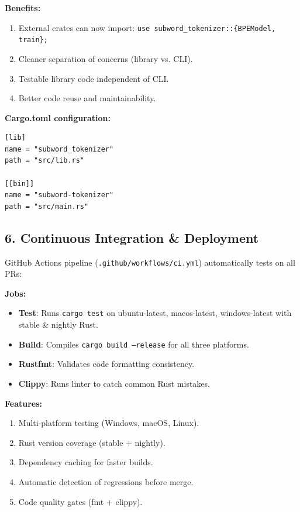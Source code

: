 \documentclass[11pt]{article}
\begin{document}
\textbf{Benefits:}
\begin{enumerate}[leftmargin=1.5em]
  \item External crates can now import: \texttt{use subword\_tokenizer::\{BPEModel, train\};}
  \item Cleaner separation of concerns (library vs. CLI).
  \item Testable library code independent of CLI.
  \item Better code reuse and maintainability.
\end{enumerate}

\textbf{Cargo.toml configuration:}
\begin{verbatim}
[lib]
name = "subword_tokenizer"
path = "src/lib.rs"

[[bin]]
name = "subword-tokenizer"
path = "src/main.rs"
\end{verbatim}

\subsection{6. Continuous Integration \& Deployment}
GitHub Actions pipeline (\texttt{.github/workflows/ci.yml}) automatically tests on all PRs:

\textbf{Jobs:}
\begin{itemize}[leftmargin=1.2em]
  \item \textbf{Test}: Runs \texttt{cargo test} on ubuntu-latest, macos-latest, windows-latest with stable \& nightly Rust.
  \item \textbf{Build}: Compiles \texttt{cargo build --release} for all three platforms.
  \item \textbf{Rustfmt}: Validates code formatting consistency.
  \item \textbf{Clippy}: Runs linter to catch common Rust mistakes.
\end{itemize}

\textbf{Features:}
\begin{enumerate}[leftmargin=1.5em]
  \item Multi-platform testing (Windows, macOS, Linux).
  \item Rust version coverage (stable + nightly).
  \item Dependency caching for faster builds.
  \item Automatic detection of regressions before merge.
  \item Code quality gates (fmt + clippy).
\end{enumerate}
\end{document}
